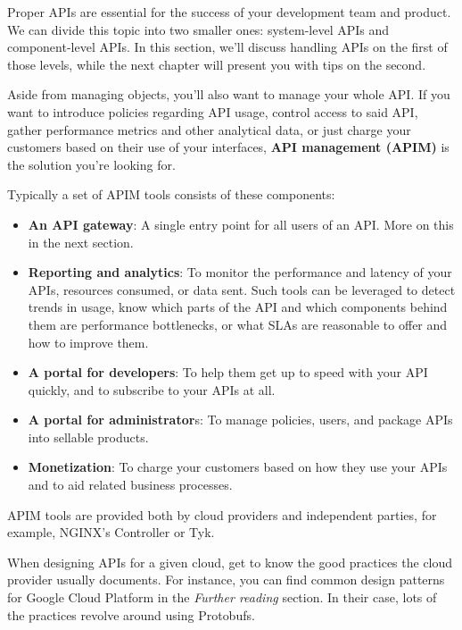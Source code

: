 
Proper APIs are essential for the success of your development team and product. We can divide this topic into two smaller ones: system-level APIs and component-level APIs. In this section, we'll discuss handling APIs on the first of those levels, while the next chapter will present you with tips on the second.

Aside from managing objects, you'll also want to manage your whole API. If you want to introduce policies regarding API usage, control access to said API, gather performance metrics and other analytical data, or just charge your customers based on their use of your interfaces, \textbf{API management (APIM)} is the solution you're looking for.

Typically a set of APIM tools consists of these components:


\begin{itemize}
\item 
\textbf{An API gateway}: A single entry point for all users of an API. More on this in the next section.


\item 
\textbf{Reporting and analytics}: To monitor the performance and latency of your APIs, resources consumed, or data sent. Such tools can be leveraged to detect trends in usage, know which parts of the API and which components behind them are performance bottlenecks, or what SLAs are reasonable to offer and how to improve them.

\item 
\textbf{A portal for developers}: To help them get up to speed with your API quickly, and to subscribe to your APIs at all.


\item 
\textbf{A portal for administrator}s: To manage policies, users, and package APIs into sellable products.


\item 
\textbf{Monetization}: To charge your customers based on how they use your APIs and to aid related business processes.
\end{itemize}

APIM tools are provided both by cloud providers and independent parties, for example, NGINX's Controller or Tyk. 

When designing APIs for a given cloud, get to know the good practices the cloud provider usually documents. For instance, you can find common design patterns for Google Cloud Platform in the \textit{Further reading} section. In their case, lots of the practices revolve around using Protobufs.

